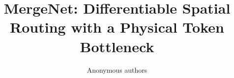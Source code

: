 \documentclass{article}
\title{MergeNet: Differentiable Spatial Routing with a Physical Token Bottleneck}
\author{Anonymous authors}
\begin{document}
\raggedbottom
\maketitle







\FloatBarrier







\clearpage
\appendix

\FloatBarrier

\end{document}
